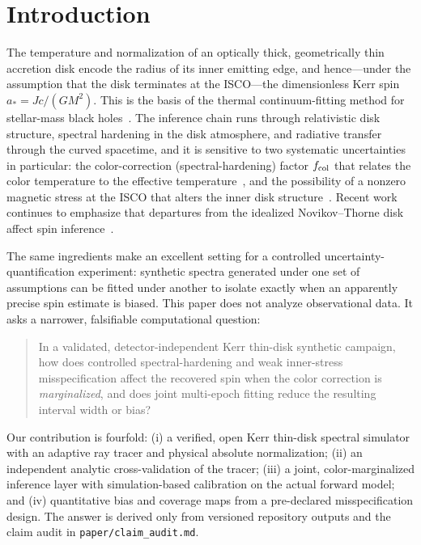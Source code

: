 \documentclass[aip,reprint,amsmath,amssymb]{revtex4-2}
\begin{document}
\section{Introduction}

The temperature and normalization of an optically thick, geometrically thin
accretion disk encode the radius of its inner emitting edge, and hence---under
the assumption that the disk terminates at the ISCO---the dimensionless Kerr spin
$a_\ast = Jc/(GM^2)$. This is the basis of the thermal continuum-fitting method
for stellar-mass black holes~\cite{McClintockNarayanSteiner2014}. The inference
chain runs through relativistic disk structure, spectral hardening in the disk
atmosphere, and radiative transfer through the curved spacetime, and it is
sensitive to two systematic uncertainties in particular: the color-correction
(spectral-hardening) factor $f_{\rm col}$ that relates the color temperature to
the effective temperature~\cite{DavisBlaesHubenyTurner2005,DavisHubeny2006,SalvesenMiller2021},
and the possibility of a nonzero magnetic stress at the ISCO that alters the
inner disk structure~\cite{AgolKrolik2000,KulkarniPennaShafee2011,PennaMcKinneyNarayan2010}.
Recent work continues to emphasize that departures from the idealized
Novikov--Thorne disk affect spin inference~\cite{MummeryIngramDavisFabian2024,MummeryEtAl2025RapidOrPlunging}.

The same ingredients make an excellent setting for a controlled
uncertainty-quantification experiment: synthetic spectra generated under one set
of assumptions can be fitted under another to isolate exactly when an apparently
precise spin estimate is biased. This paper does not analyze observational data.
It asks a narrower, falsifiable computational question:

\begin{quote}
In a validated, detector-independent Kerr thin-disk synthetic campaign, how does
controlled spectral-hardening and weak inner-stress misspecification affect the
recovered spin when the color correction is \emph{marginalized}, and does joint
multi-epoch fitting reduce the resulting interval width or bias?
\end{quote}

Our contribution is fourfold: (i) a verified, open Kerr thin-disk spectral
simulator with an adaptive ray tracer and physical absolute normalization; (ii)
an independent analytic cross-validation of the tracer; (iii) a joint,
color-marginalized inference layer with simulation-based calibration on the
actual forward model; and (iv) quantitative bias and coverage maps from a
pre-declared misspecification design. The answer is derived only from versioned
repository outputs and the claim audit in \texttt{paper/claim\_audit.md}.
\end{document}
